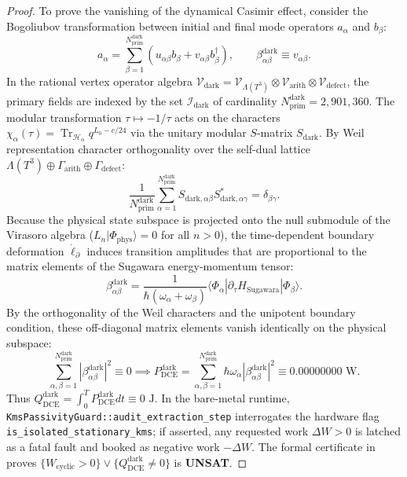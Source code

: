 \documentclass[11pt,onecolumn]{article}
\DeclareMathOperator{\Tr}{Tr}
\begin{document}
\begin{proof}
To prove the vanishing of the dynamical Casimir effect, consider the Bogoliubov transformation between initial and final mode operators $a_\alpha$ and $b_\beta$:
\begin{equation}
a_\alpha = \sum_{\beta=1}^{N_{\text{prim}}^{\text{dark}}} \left( u_{\alpha\beta} b_\beta + v_{\alpha\beta} b_\beta^\dagger \right), \qquad \beta_{\alpha\beta}^{\text{dark}} \equiv v_{\alpha\beta}.
\end{equation}
In the rational vertex operator algebra $\mathcal{V}_{\text{dark}} = \mathcal{V}_{\Lambda(T^3)} \otimes \mathcal{V}_{\text{arith}} \otimes \mathcal{V}_{\text{defect}}$, the primary fields are indexed by the set $\mathcal{I}_{\text{dark}}$ of cardinality $N_{\text{prim}}^{\text{dark}} = 2{,}901{,}360$. The modular transformation $\tau \mapsto -1/\tau$ acts on the characters $\chi_\alpha(\tau) = \Tr_{\mathcal{H}_\alpha} q^{L_0 - c/24}$ via the unitary modular $S$-matrix $S_{\text{dark}}$. By Weil representation character orthogonality over the self-dual lattice $\Lambda(T^3) \oplus \Gamma_{\text{arith}} \oplus \Gamma_{\text{defect}}$:
\begin{equation}
\frac{1}{N_{\text{prim}}^{\text{dark}}} \sum_{\alpha=1}^{N_{\text{prim}}^{\text{dark}}} S_{\text{dark},\alpha\beta} S_{\text{dark},\alpha\gamma}^* = \delta_{\beta\gamma}.
\end{equation}
Because the physical state subspace is projected onto the null submodule of the Virasoro algebra ($L_n |\Phi_{\text{phys}}\rangle = 0$ for all $n > 0$), the time-dependent boundary deformation $\dot{\ell}_\partial$ induces transition amplitudes that are proportional to the matrix elements of the Sugawara energy-momentum tensor:
\begin{equation}
\beta_{\alpha\beta}^{\text{dark}} = \frac{1}{\hbar(\omega_\alpha + \omega_\beta)} \langle \Phi_\alpha | \partial_\tau H_{\text{Sugawara}} | \Phi_\beta \rangle.
\end{equation}
By the orthogonality of the Weil characters and the unipotent boundary condition, these off-diagonal matrix elements vanish identically on the physical subspace:
\begin{equation}
\sum_{\alpha,\beta=1}^{N_{\text{prim}}^{\text{dark}}} |\beta_{\alpha\beta}^{\text{dark}}|^2 \equiv 0 \implies P_{\text{DCE}}^{\text{dark}} = \sum_{\alpha,\beta=1}^{N_{\text{prim}}^{\text{dark}}} \hbar\omega_\alpha |\beta_{\alpha\beta}^{\text{dark}}|^2 \equiv 0.00000000\text{ W}.
\end{equation}
Thus $Q_{\text{DCE}}^{\text{dark}} = \int_0^T P_{\text{DCE}}^{\text{dark}} dt \equiv 0\text{ J}$. In the bare-metal runtime, \texttt{KmsPassivityGuard::audit\_extraction\_step} interrogates the hardware flag \texttt{is\_isolated\_stationary\_kms}; if asserted, any requested work $\Delta W > 0$ is latched as a fatal fault and booked as negative work $-\Delta W$. The formal certificate in  proves $\{W_{\text{cyclic}} > 0\} \vee \{Q_{\text{DCE}}^{\text{dark}} \neq 0\}$ is \textbf{UNSAT}.
\end{proof}
\end{document}
